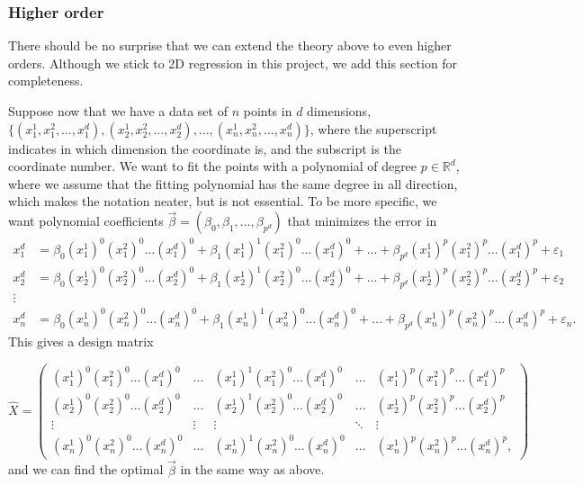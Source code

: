 \subsubsection{Higher order}
There should be no surprise that we can extend the theory above to even higher orders. 
Although we stick to 2D regression in this project, we add this section for completeness. 

Suppose now that we have a data set of $n$ points in $d$ dimensions, \\ $\{(x_1^1, x_1^2, \hdots, x_1^d), (x_2^1, x_2^2,\hdots, x_2^d),\hdots, (x_n^1, x_n^2,\hdots,x_n^d)\}$, where the superscript indicates in which dimension the coordinate is, and the subscript is the coordinate number. We want to fit the points with a polynomial of degree $p\in\mathbb{R}^d$, where we assume that the fitting polynomial has the same degree in all direction, which makes the notation neater, but is not essential. To be more specific, we want polynomial coefficients $\vec{\beta}=(\beta_0, \beta_1, \hdots, \beta_{p^d})$ that minimizes the error in 
\begin{align*}
x_1^d&=\beta_0(x_1^1)^0(x_1^2)^0\hdots(x_1^d)^0 +\beta_1(x_1^1)^1(x_1^2)^0\hdots(x_1^d)^0+\hdots+\beta_{p^d}(x_1^1)^p(x_1^2)^p\hdots(x_1^d)^p+\varepsilon_1\\
x_2^d&=\beta_0(x_2^1)^0(x_2^2)^0\hdots(x_2^d)^0 +\beta_1(x_2^1)^1(x_2^2)^0\hdots(x_2^d)^0+\hdots+\beta_{p^d}(x_2^1)^p(x_2^2)^p\hdots(x_2^d)^p+\varepsilon_2\\
\vdots\\
x_n^d&=\beta_0(x_n^1)^0(x_n^2)^0\hdots(x_n^d)^0 +\beta_1(x_n^1)^1(x_n^2)^0\hdots(x_n^d)^0+\hdots+\beta_{p^d}(x_n^1)^p(x_n^2)^p\hdots(x_n^d)^p+\varepsilon_n.
\end{align*}
This gives a design matrix

\begin{equation}
\hat{X}=
\begin{pmatrix}
(x_1^1)^0(x_1^2)^0\hdots(x_1^d)^0&\hdots& (x_1^1)^1(x_1^2)^0\hdots(x_1^d)^0&\hdots&(x_1^1)^p(x_1^2)^p\hdots(x_1^d)^p\\
(x_2^1)^0(x_2^2)^0\hdots(x_2^d)^0&\hdots& (x_2^1)^1(x_2^2)^0\hdots(x_2^d)^0&\hdots&(x_2^1)^p(x_2^2)^p\hdots(x_2^d)^p\\
\vdots&\vdots&\vdots&\ddots&\vdots\\
(x_n^1)^0(x_n^2)^0\hdots(x_n^d)^0&\hdots& (x_n^1)^1(x_n^2)^0\hdots(x_n^d)^0&\hdots&(x_n^1)^p(x_n^2)^p\hdots(x_n^d)^p,
\end{pmatrix}
\end{equation}
and we can find the optimal $\vec{\beta}$ in the same way as above. 

